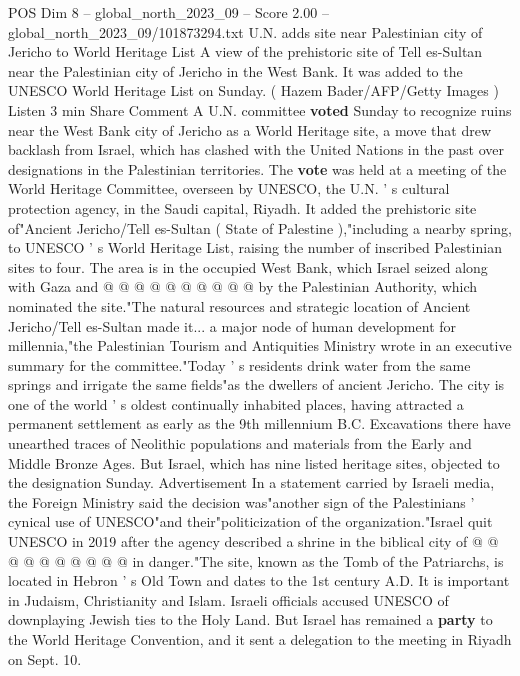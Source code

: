 \begin{textsample}{POS Dim 8 – global\_north\_2023\_09 – Score 2.00 – global\_north\_2023\_09/101873294.txt}  \label{ex:f8_pos_303}
U.N. adds site near Palestinian city of Jericho to World Heritage List A view of the prehistoric site of Tell es-Sultan near the Palestinian city of Jericho in the West Bank.
It was added to the UNESCO World Heritage List on Sunday. ( Hazem Bader/AFP/Getty Images ) Listen 3 min Share Comment A U.N. committee \textbf{voted} Sunday to recognize ruins near the West Bank city of Jericho as a World Heritage site, a move that drew backlash from Israel, which has clashed with the United Nations in the past over designations in the Palestinian territories.
The \textbf{vote} was held at a meeting of the World Heritage Committee, overseen by UNESCO, the U.N. ' s cultural protection agency, in the Saudi capital, Riyadh.
It added the prehistoric site of"Ancient Jericho/Tell es-Sultan ( State of Palestine ),"including a nearby spring, to UNESCO ' s World Heritage List, raising the number of inscribed Palestinian sites to four.
The area is in the occupied West Bank, which Israel seized along with Gaza and @ @ @ @ @ @ @ @ @ @ by the Palestinian Authority, which nominated the site."The natural resources and strategic location of Ancient Jericho/Tell es-Sultan made it... a major node of human development for millennia,"the Palestinian Tourism and Antiquities Ministry wrote in an executive summary for the committee."Today ' s residents drink water from the same springs and irrigate the same fields"as the dwellers of ancient Jericho.
The city is one of the world ' s oldest continually inhabited places, having attracted a permanent settlement as early as the 9th millennium B.C.
Excavations there have unearthed traces of Neolithic populations and materials from the Early and Middle Bronze Ages.
But Israel, which has nine listed heritage sites, objected to the designation Sunday.
Advertisement In a statement carried by Israeli media, the Foreign Ministry said the decision was"another sign of the Palestinians ' cynical use of UNESCO"and their"politicization of the organization."Israel quit UNESCO in 2019 after the agency described a shrine in the biblical city of @ @ @ @ @ @ @ @ @ @ in danger."The site, known as the Tomb of the Patriarchs, is located in Hebron ' s Old Town and dates to the 1st century A.D.
It is important in Judaism, Christianity and Islam.
Israeli officials accused UNESCO of downplaying Jewish ties to the Holy Land.
But Israel has remained a \textbf{party} to the World Heritage Convention, and it sent a delegation to the meeting in Riyadh on Sept. 10.

\end{textsample}
